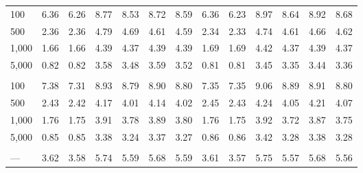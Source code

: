 \documentclass[AMA,STIX1COL,doublespace]{WileyNJD-v2}
\begin{document}
\begin{table}
\begin{tabular}[t]{lcccccccccccc}
\addlinespace[0.75em]
\multicolumn{13}{l}{\textbf{10 predictors, 40 junk}}\\
\hline
\hspace{1em}100 & 6.36 & 6.26 & 8.77 & 8.53 & 8.72 & 8.59 & 6.36 & 6.23 & 8.97 & 8.64 & 8.92 & 8.68\\
\hspace{1em}500 & 2.36 & 2.36 & 4.79 & 4.69 & 4.61 & 4.59 & 2.34 & 2.33 & 4.74 & 4.61 & 4.66 & 4.62\\
\hspace{1em}1,000 & 1.66 & 1.66 & 4.39 & 4.37 & 4.39 & 4.39 & 1.69 & 1.69 & 4.42 & 4.37 & 4.39 & 4.37\\
\hspace{1em}5,000 & 0.82 & 0.82 & 3.58 & 3.48 & 3.59 & 3.52 & 0.81 & 0.81 & 3.45 & 3.35 & 3.44 & 3.36\\
\addlinespace[0.75em]
\multicolumn{13}{l}{\textbf{10 predictors, 490 junk}}\\
\hline
\hspace{1em}100 & 7.38 & 7.31 & 8.93 & 8.79 & 8.90 & 8.80 & 7.35 & 7.35 & 9.06 & 8.89 & 8.91 & 8.80\\
\hspace{1em}500 & 2.43 & 2.42 & 4.17 & 4.01 & 4.14 & 4.02 & 2.45 & 2.43 & 4.24 & 4.05 & 4.21 & 4.07\\
\hspace{1em}1,000 & 1.76 & 1.75 & 3.91 & 3.78 & 3.89 & 3.80 & 1.76 & 1.75 & 3.92 & 3.72 & 3.87 & 3.75\\
\hspace{1em}5,000 & 0.85 & 0.85 & 3.38 & 3.24 & 3.37 & 3.27 & 0.86 & 0.86 & 3.42 & 3.28 & 3.38 & 3.28\\
\addlinespace[0.75em]
\multicolumn{13}{l}{\textbf{Overall}}\\
\hline
\hspace{1em}--- & 3.62 & 3.58 & 5.74 & 5.59 & 5.68 & 5.59 & 3.61 & 3.57 & 5.75 & 5.57 & 5.68 & 5.56\\
\bottomrule
\end{tabular}
\end{table}
\end{document}
